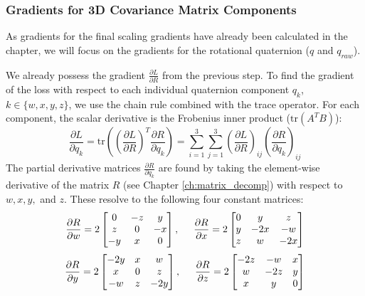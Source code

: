 \subsubsection{Gradients for 3D Covariance Matrix Components}

As gradients for the final scaling gradients have already been calculated in the chapter, we will focus on the gradients for the rotational quaternion ($q$ and $q_{raw}$).

We already possess the gradient $\frac{\partial L}{\partial R}$ from the previous step. To find the gradient of the loss with respect to each individual quaternion component $q_k$, $k \in \{w, x, y, z\}$, we use the chain rule combined with the trace operator. For each component, the scalar derivative is the Frobenius inner product ($\text{tr}(A^T B)$):
$$
\frac{\partial L}{\partial q_k} =
\text{tr}\left( \left(\frac{\partial L}{\partial R}\right)^T \frac{\partial R}{\partial q_k} \right) =
\sum_{i=1}^{3} \sum_{j=1}^{3} \left( \frac{\partial L}{\partial R} \right)_{ij} \left( \frac{\partial R}{\partial q_k} \right)_{ij}
$$
The partial derivative matrices $\frac{\partial R}{\partial q_k}$ are found by taking the element-wise derivative of the matrix $R$ (see Chapter \ref{ch:matrix_decomp}) with respect to $w, x, y,$ and $z$. These resolve to the following four constant matrices:
$$
\frac{\partial R}{\partial w} = 2 \begin{bmatrix} 0 & -z & y \\ z & 0 & -x \\ -y & x & 0 \end{bmatrix},
\hspace{5mm}
\frac{\partial R}{\partial x} = 2 \begin{bmatrix} 0 & y & z \\ y & -2x & -w \\ z & w & -2x \end{bmatrix}
$$
$$
\frac{\partial R}{\partial y} = 2 \begin{bmatrix} -2y & x & w \\ x & 0 & z \\ -w & z & -2y \end{bmatrix},
\hspace{5mm}
\frac{\partial R}{\partial z} = 2 \begin{bmatrix} -2z & -w & x \\ w & -2z & y \\ x & y & 0 \end{bmatrix}
$$
